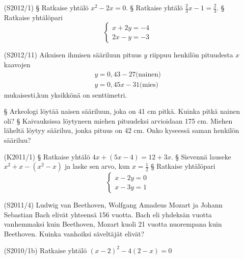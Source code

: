\begin{tehtava} (S2012/1)
\alakohdat
		§ Ratkaise yhtälö $x^2-2x=0$.
		§ Ratkaise yhtälö $\frac{2}{3}x-1=\frac{2}{3}$.
		§ Ratkaise yhtälöpari
		\[
\left\{
\begin{aligned}
 x+2y=-4  \\
 2x-y=-3  
\end{aligned}
\right. 
\]
	\loppu
\end{tehtava}

\begin{tehtava} (S2012/11) 
Aikuisen ihmisen sääriluun pituus $y$ riippuu henkilön pituudesta $x$ kaavojen 
\[
\begin{aligned}
 y=0,43-27 \text{(nainen)} \\
 y=0,45x-31  \text{(mies)}
\end{aligned}
\]
mukaisesti,kun yksikkönä on senttimetri.

  \alakohdat
		§ Arkeologi löytää naisen sääriluun, joka on 41 cm pitkä. Kuinka pitkä nainen oli?
		§ Kaivauksissa löytyneen miehen pituudeksi arvioidaan 175 cm. Miehen läheltä löytyy sääriluu, jonka pituus on 42 cm. Onko  kyseessä saman henkilön sääriluu?		
  \loppu
 

\end{tehtava}



\begin{tehtava} (K2011/1)
\alakohdat
		§ Ratkaise yhtälö $4x+(5x-4)=12+3x$.
		§ Sievennä lauseke $x^2+x-(x^2-x)$ ja laske sen arvo, kun $x=\frac{1}{2}$
		§ Ratkaise yhtälöpari
		\[
\left\{
\begin{aligned}
 x-2y=0  \\
 x-3y=1  
\end{aligned}
\right. 
\]
	\loppu
\end{tehtava}


\begin{tehtava}  (S2011/4)
Ludwig van Beethoven, Wolfgang Amadeus Mozart ja Johann Sebastian Bach elivät yhteensä 156 vuotta. Bach eli yhdeksän vuotta vanhemmaksi kuin Beethoven, Mozart kuoli 21 vuotta nuorempana kuin Beethoven. Kuinka vanhoiksi säveltäjät elivät?
\end{tehtava}

\begin{tehtava}  (S2010/1b)
Ratkaise yhtälö $(x-2)^2-4(2-x)=0$
\end{tehtava}

